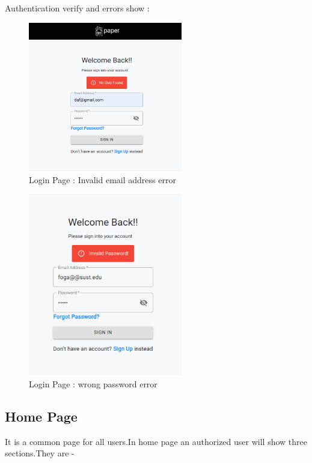 \documentclass[10pt]{article}
\begin{document}
Authentication verify and errors show :

\begin{figure}[H]
  \centering
  \centerline{\includegraphics[width=0.6\textwidth]{login/login-error1.png}}
  \caption{Login Page : Invalid email address error}
  \label{fig}
\end{figure}

\begin{figure}[H]
  \centering
  \centerline{\includegraphics[width=0.6\textwidth]{login/login-error2.png}}
  \caption{Login Page : wrong password error}
  \label{fig}
\end{figure}

\subsection{Home Page}
It is a common page for all users.In home page an authorized user will show three sections.They are -
\end{document}
